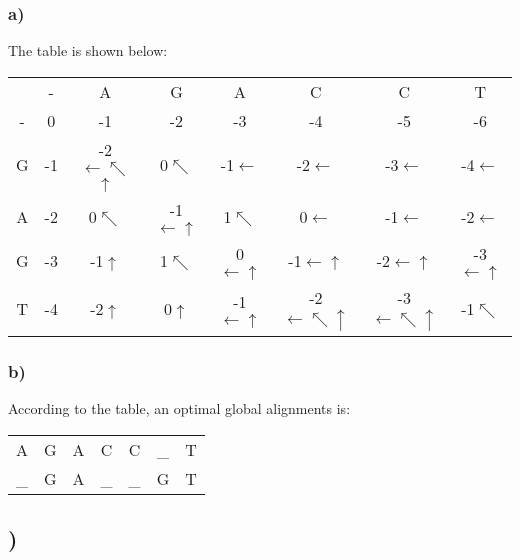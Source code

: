 \documentclass{article}
\begin{document}
\subsubsection{a)}
The table is shown below:
\begin{center}
\begin{tabular}{c|c|c|c|c|c|c|c|}
\multicolumn{1}{c}{ } & \multicolumn{1}{c}{-} & \multicolumn{1}{c}{A} & \multicolumn{1}{c}{G} & \multicolumn{1}{c}{A} & \multicolumn{1}{c}{C} & \multicolumn{1}{c}{C} & \multicolumn{1}{c}{T} \\
\cline{2-8}
- & 0 & \cellcolor{red!50}-1 & -2 & -3 & -4 & -5 & -6 \\
\cline{2-8}
G & \cellcolor{red!50}-1 & -2$\leftarrow\nwarrow$$\uparrow$ & \cellcolor{red!50}0$\nwarrow$ & -1$\leftarrow$ & -2$\leftarrow$ & -3$\leftarrow$ & -4$\leftarrow$ \\
\cline{2-2}
A & -2 & \cellcolor{red!50}0$\nwarrow$ & -1$\leftarrow\uparrow$ & \cellcolor{red!50}1$\nwarrow$ & \cellcolor{red!50}0$\leftarrow$ & \cellcolor{red!50}-1$\leftarrow$ & -2$\leftarrow$ \\
\cline{2-2}
G & -3 & -1$\uparrow$ & \cellcolor{red!50}1$\nwarrow$ & \cellcolor{red!50}0$\leftarrow\uparrow$ & \cellcolor{red!50}-1$\leftarrow\uparrow$ & \cellcolor{red!50}-2$\leftarrow\uparrow$ & -3$\leftarrow\uparrow$ \\
\cline{2-2}
T & -4 & -2$\uparrow$ & 0$\uparrow$ & -1$\leftarrow\uparrow$ & -2$\leftarrow\nwarrow\uparrow$ & -3$\leftarrow\nwarrow\uparrow$ & \cellcolor{red!50}-1$\nwarrow$ \\
\cline{2-8}
\end{tabular}
\end{center}
\subsubsection{b)}
According to the table, an optimal global alignments is:
\begin{center}
\begin{tabular}{ccccccc}
	 A &  G &  A &  C &  C & \_ & T \\
	\_ &  G &  A & \_ & \_ &  G & T
\end{tabular}
\end{center}

\subsection{)}
\end{document}
